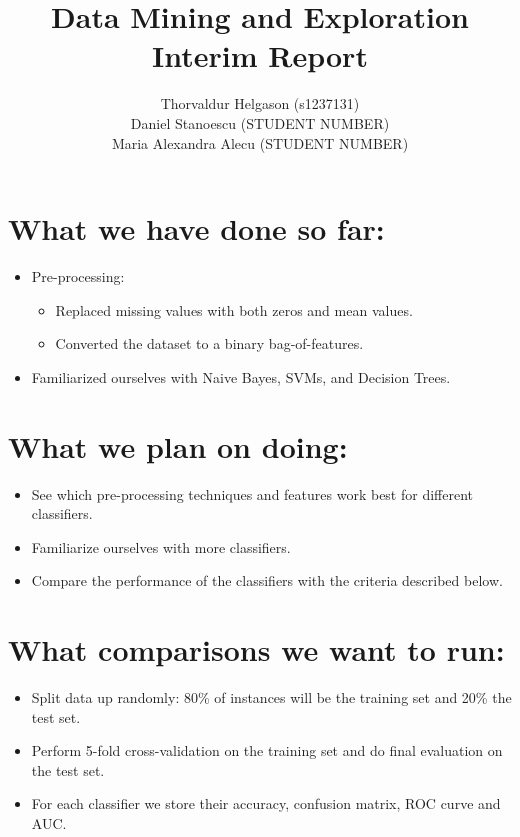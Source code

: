 \documentclass[a4paper,11pt]{article}
\title{Data Mining and Exploration\\Interim Report}
\author{Thorvaldur Helgason (s1237131) \\
Daniel Stanoescu (STUDENT NUMBER) \\
Maria Alexandra Alecu (STUDENT NUMBER)}
\begin{document}
    
\maketitle

\section*{What we have done so far:}
\begin{itemize}
	\item Pre-processing:
	\begin{itemize}
		\item Replaced missing values with both zeros and mean values.
		\item Converted the dataset to a binary bag-of-features.
	\end{itemize}
	\item Familiarized ourselves with Naive Bayes, SVMs, and Decision Trees.
\end{itemize}

\section*{What we plan on doing:}
\begin{itemize}
	\item See which pre-processing techniques and features work best for different classifiers.
	\item Familiarize ourselves with more classifiers.
	\item Compare the performance of the classifiers with the criteria described below.
\end{itemize}

\section*{What comparisons we want to run:}
\begin{itemize}
	\item Split data up randomly: 80\% of instances will be the training set and 20\% the test set.
	\item Perform 5-fold cross-validation on the training set and do final evaluation on the test set.
	\item For each classifier we store their accuracy, confusion matrix, ROC curve and AUC.
\end{itemize}
\end{document}
